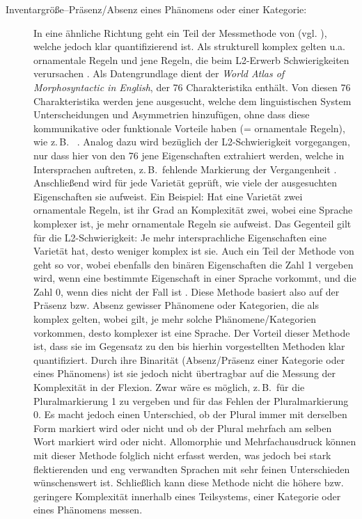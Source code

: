 \begin{exe}
\begin{exe}
\begin{description}
\item[Inventargröße--Präsenz/Absenz eines Phänomens oder einer Kategorie:] In eine ähnliche Richtung geht ein Teil der Messmethode von \citet{SzmrecsanyiKortmann2009} (vgl. ), welche jedoch klar quantifizierend ist. Als strukturell komplex gelten u.a. ornamentale Regeln und jene Regeln, die beim L2-Er\-werb Schwierigkeiten verursachen \citep[64–65]{SzmrecsanyiKortmann2009}. Als Datengrundlage dient der \textit{World Atlas of Morphosyntactic  in English}, der 76 Charakteristika enthält. Von diesen 76 Charakteristika werden jene ausgesucht, welche dem linguistischen System Unterscheidungen und Asymmetrien hinzufügen, ohne dass diese kommunikative oder funktionale Vorteile haben (= ornamentale Regeln), wie z.\,B.\  \citep[68]{SzmrecsanyiKortmann2009}. Analog dazu wird bezüglich der L2-Schwie\-rig\-keit vorgegangen, nur dass hier von den 76 jene Eigenschaften extrahiert werden, welche in Intersprachen auftreten, z.\,B.\ fehlende Markierung der Vergangenheit \citep[69]{SzmrecsanyiKortmann2009}. Anschließend wird für jede Varietät geprüft, wie viele der ausgesuchten Eigenschaften sie aufweist. Ein Beispiel: Hat eine Varietät zwei ornamentale Regeln, ist ihr Grad an Komplexität zwei, wobei eine Sprache komplexer ist, je mehr ornamentale Regeln sie aufweist. Das Gegenteil gilt für die L2-Schwie\-rig\-keit: Je mehr intersprachliche Eigenschaften eine Varietät hat, desto weniger komplex ist sie. Auch ein Teil der Methode von \citet{Nichols2016} geht so vor, wobei ebenfalls den binären Eigenschaften die Zahl 1 vergeben wird, wenn eine bestimmte Eigenschaft in einer Sprache vorkommt, und die Zahl 0, wenn dies nicht der Fall ist \citep[137]{Nichols2016}. Diese Methode basiert also auf der Präsenz bzw. Absenz gewisser Phänomene oder Kategorien, die als komplex gelten, wobei gilt, je mehr solche Phänomene/Kategorien vorkommen, desto komplexer ist eine Sprache. Der Vorteil dieser Methode ist, dass sie im Gegensatz zu den bis hierhin vorgestellten Methoden klar quantifiziert. Durch ihre Binarität (Absenz/Präsenz einer Kategorie oder eines Phänomens) ist sie jedoch nicht übertragbar auf die Messung der Komplexität in der Flexion. Zwar wäre es möglich, z.\,B.\ für die Pluralmarkierung 1 zu vergeben und für das Fehlen der Pluralmarkierung 0. Es macht jedoch einen Unterschied, ob der Plural immer mit derselben Form markiert wird oder nicht und ob der Plural mehrfach am selben Wort markiert wird oder nicht. Allomorphie und Mehrfachausdruck können mit dieser Methode folglich nicht erfasst werden, was jedoch bei stark flektierenden und eng verwandten Sprachen mit sehr feinen Unterschieden wünschenswert ist. Schließlich kann diese Methode nicht die höhere bzw. geringere Komplexität innerhalb eines Teilsystems, einer Kategorie oder eines Phänomens messen.


\end{description}
\end{exe}
\end{exe}
